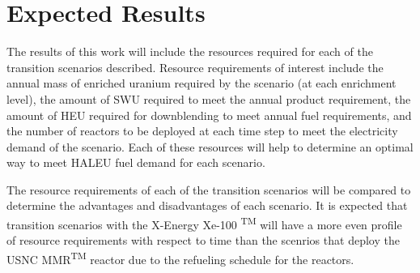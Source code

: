 \section{Expected Results}

The results of this work will include the resources required 
for each of the transition scenarios described. Resource requirements
of interest include the annual mass of enriched uranium required by 
the scenario (at each enrichment level), the amount of 
\gls{SWU} required to meet the annual product requirement, the amount 
of \gls{HEU} required for downblending to meet annual fuel requirements, 
and the number of reactors to be deployed at each time step to meet the 
electricity demand of the scenario. Each of these resources will help
to determine an optimal way to meet \gls{HALEU} fuel demand for each 
scenario. 

The resource requirements of each of the transition scenarios will 
be compared to determine the advantages and disadvantages of each 
scenario. It is expected that transition scenarios with the X-Energy 
Xe-100 \textsuperscript{TM} will have a more even profile of resource 
requirements with respect to time than the scenrios that deploy the 
\gls{USNC} \gls{MMR}\textsuperscript{TM} reactor due to the refueling 
schedule for the reactors. 

